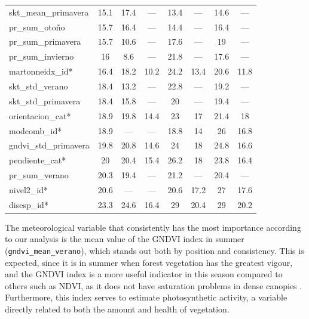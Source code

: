 \begin{table}[htbp]
\begin{tabular}{lccccccc}
    skt\_mean\_primavera & 15.1 & 17.4 & --- & 13.4 & --- & 14.6 & --- \\
    pr\_sum\_otoño & 15.7 & 16.4 & --- & 14.4 & --- & 16.4 & --- \\
    pr\_sum\_primavera & 15.7 & 10.6 & --- & 17.6 & --- & 19 & --- \\
    pr\_sum\_invierno & 16 & 8.6 & --- & 21.8 & --- & 17.6 & --- \\
    martonneidx\_id* & 16.4 & 18.2 & 10.2 & 24.2 & 13.4 & 20.6 & 11.8 \\
    skt\_std\_verano & 18.4 & 13.2 & --- & 22.8 & --- & 19.2 & --- \\
    skt\_std\_primavera & 18.4 & 15.8 & --- & 20 & --- & 19.4 & --- \\
    orientacion\_cat* & 18.9 & 19.8 & 14.4 & 23 & 17 & 21.4 & 18 \\
    modcomb\_id* & 18.9 & --- & --- & 18.8 & 14 & 26 & 16.8 \\
    gndvi\_std\_primavera & 19.8 & 20.8 & 14.6 & 24 & 18 & 24.8 & 16.6 \\
    pendiente\_cat* & 20 & 20.4 & 15.4 & 26.2 & 18 & 23.8 & 16.4 \\
    pr\_sum\_verano & 20.3 & 19.4 & --- & 21.2 & --- & 20.4 & --- \\
    nivel2\_id* & 20.6 & --- & --- & 20.6 & 17.2 & 27 & 17.6 \\
    disesp\_id* & 23.3 & 24.6 & 16.4 & 29 & 20.4 & 29 & 20.2 \\
    \bottomrule
  \end{tabular}
\end{table}

The meteorological variable that consistently has the most importance according to our analysis is the mean value of the GNDVI index in summer (\texttt{gndvi_mean_verano}), which stands out both by position and consistency. This is expected, since it is in summer when forest vegetation has the greatest vigour, and the GNDVI index is a more useful indicator in this season compared to others such as NDVI, as it does not have saturation problems in dense canopies \cite{eos2025indices_vegetacion, ign_pnoa_lidar_tercera}. Furthermore, this index serves to estimate photosynthetic activity, a variable directly related to both the amount and health of vegetation.

